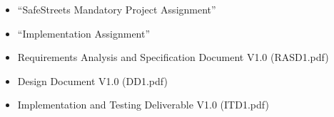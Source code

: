 \clearpage
{}
\label{sect:effort}


\clearpage
{}


\begin{itemize}
        \item “SafeStreets Mandatory Project Assignment”
        \item “Implementation Assignment”
        \item Requirements Analysis and Specification Document V1.0 (RASD1.pdf)
        \item Design Document V1.0 (DD1.pdf)
        \item Implementation and Testing Deliverable V1.0 (ITD1.pdf) 
\end{itemize}


